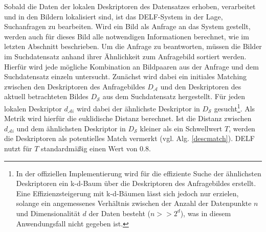 Sobald die Daten der lokalen Deskriptoren des Datensatzes erhoben, verarbeitet und in den Bildern lokalisiert sind, ist das DELF-System in der Lage, Suchanfragen zu bearbeiten. Wird ein Bild als Anfrage an das System gestellt, werden auch für dieses Bild alle notwendigen Informationen berechnet, wie im letzten Abschnitt beschrieben. Um die Anfrage zu beantworten, müssen die Bilder im Suchdatensatz anhand ihrer Ähnlichkeit zum Anfragebild sortiert werden. Hierfür wird jede mögliche Kombination an Bildpaaren aus der Anfrage und dem Suchdatensatz einzeln untersucht. Zunächst wird dabei ein initiales Matching zwischen den Deskriptoren des Anfragebildes $D_\mathcal{A}$ und den Deskriptoren des aktuell betrachteten Bildes $D_\mathcal{S}$ aus dem Suchdatensatz hergestellt. Für jeden lokalen Deskriptor $d_{\mathcal{A}i}$ wird dabei der ähnlichste Deskriptor in $D_\mathcal{S}$ gesucht\footnote{In der offiziellen Implementierung wird für die effiziente Suche der ähnlichsten Deskriptoren ein k-d-Baum \cite{kd_tree} über die Deskriptoren des Anfragebildes erstellt. Eine Effizienzsteigerung mit k-d-Bäumen lässt sich jedoch nur erzielen, solange ein angemessenes Verhältnis zwischen der Anzahl der Datenpunkte $n$ und Dimensionalität $d$ der Daten besteht ($n >> 2^d$)\cite{curse_of_dim}, was in diesem Anwendungsfall nicht gegeben ist.}. Als Metrik wird hierfür die euklidische Distanz berechnet. Ist die Distanz zwischen $d_{\mathcal{A}i}$ und dem ähnlichsten Deskriptor in $D_\mathcal{S}$ kleiner als ein Schwellwert $T$, werden die Deskriptoren als potentielles Match vermerkt (vgl. Alg. \ref{descmatch}).
DELF nutzt für $T$ standardmäßig einen Wert von $0.8$.

